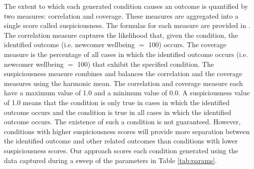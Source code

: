 \documentclass{scspaperproc}
\theoremstyle{scsthe}
\begin{document}
The extent to which each generated condition causes an outcome is quantified by two measures: correlation and coverage. These measures are aggregated into a single score called suspiciousness. The formulas for each measure are provided in \cite{diallo2016formal}. The correlation measure captures the likelihood that, given the condition, the identified outcome (i.e. newcomer wellbeing $=$ 100) occurs. The coverage measure is the percentage of all cases in which the identified outcome occurs (i.e. newcomer wellbeing $=$ 100) that exhibit the specified condition. The suspiciousness measure combines and balances the correlation and the coverage measures using the harmonic mean. The correlation and coverage measure each have a maximum value of 1.0 and a minimum value of 0.0. A suspiciousness value of 1.0 means that the condition is only true in cases in which the identified outcome occurs and the condition is true in all cases in which the identified outcome occurs. The existence of such a condition is not guaranteed. However, conditions with higher suspiciousness scores will provide more separation between the identified outcome and other related outcomes than conditions with lower suspiciousness scores. Our approach scores each condition generated using the data captured during a sweep of the parameters in Table \ref{tab:params}.
\end{document}
